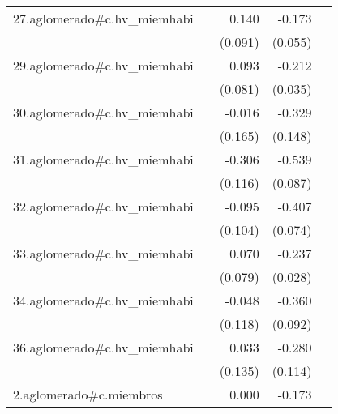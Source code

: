{\begin{longtable}{l*{4}{D{.}{.}{-1}}}
\addlinespace
27.aglomerado#c.hv\_miemhabi&                     &       0.140         &      -0.173\sym{**} &                     \\
            &                     &     (0.091)         &     (0.055)         &                     \\
\addlinespace
29.aglomerado#c.hv\_miemhabi&                     &       0.093         &      -0.212\sym{***}&                     \\
            &                     &     (0.081)         &     (0.035)         &                     \\
\addlinespace
30.aglomerado#c.hv\_miemhabi&                     &      -0.016         &      -0.329\sym{*}  &                     \\
            &                     &     (0.165)         &     (0.148)         &                     \\
\addlinespace
31.aglomerado#c.hv\_miemhabi&                     &      -0.306\sym{**} &      -0.539\sym{***}&                     \\
            &                     &     (0.116)         &     (0.087)         &                     \\
\addlinespace
32.aglomerado#c.hv\_miemhabi&                     &      -0.095         &      -0.407\sym{***}&                     \\
            &                     &     (0.104)         &     (0.074)         &                     \\
\addlinespace
33.aglomerado#c.hv\_miemhabi&                     &       0.070         &      -0.237\sym{***}&                     \\
            &                     &     (0.079)         &     (0.028)         &                     \\
\addlinespace
34.aglomerado#c.hv\_miemhabi&                     &      -0.048         &      -0.360\sym{***}&                     \\
            &                     &     (0.118)         &     (0.092)         &                     \\
\addlinespace
36.aglomerado#c.hv\_miemhabi&                     &       0.033         &      -0.280\sym{*}  &                     \\
            &                     &     (0.135)         &     (0.114)         &                     \\
\addlinespace
2.aglomerado#c.miembros&                     &       0.000         &      -0.173\sym{***}&                     \\

\end{longtable}}

